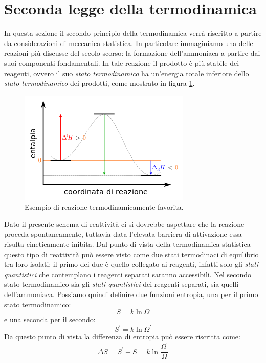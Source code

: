 \documentclass[oneside]{amsbook}
\numberwithin{section}{chapter}
\numberwithin{equation}{section}
\numberwithin{figure}{section}
\begin{document}
\section{Seconda legge della termodinamica}
In questa sezione il secondo principio della termodinamica verrà riscritto a partire da considerazioni di meccanica statistica.
In particolare immaginiamo una delle reazioni più discusse del secolo scorso: la formazione dell'ammoniaca a partire dai suoi componenti fondamentali. In tale reazione il prodotto è più stabile dei reagenti, ovvero il suo \emph{stato termodinamico} ha un'energia totale inferiore dello \emph{stato termodinamico} dei prodotti, come mostrato in figura \ref{bru}.
\begin{figure}[H]
\centering
\caption{Esempio di reazione termodinamicamente favorita.}\label{bru}
\includegraphics[scale=0.5]{bru}
\end{figure}
Dato il presente schema di reattività ci si dovrebbe aspettare che la reazione proceda spontaneamente, tuttavia data l'elevata barriera di attivazione essa risulta cineticamente inibita.
Dal punto di vista della termodinamica statistica questo tipo di reattività può essere visto come due stati termodinaci di equilibrio tra loro isolati; il primo dei due è quello collegato ai reagenti, infatti solo gli \emph{stati quantistici} che contemplano i reagenti separati saranno accessibili. Nel secondo stato termodinamico sia gli \emph{stati quantistici} dei reagenti separati, sia quelli dell'ammoniaca. 
Possiamo quindi definire due funzioni entropia, una per il primo stato termodinamico:
\begin{equation}
S=k\ln\Omega
\end{equation}
e una seconda  per il secondo:
\begin{equation}
S^\prime=k\ln\Omega^\prime
\end{equation}
Da questo punto di vista la differenza di entropia può essere riscritta come:
\begin{equation}
\Delta S=S^\prime-S=k\ln\frac{\Omega^\prime}{\Omega}
\end{equation}
\end{document}
